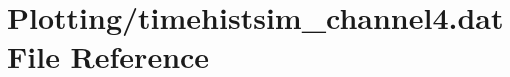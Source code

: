 \hypertarget{Plotting_2timehistsim__channel4_8dat}{}\section{Plotting/timehistsim\+\_\+channel4.dat File Reference}
\label{Plotting_2timehistsim__channel4_8dat}
